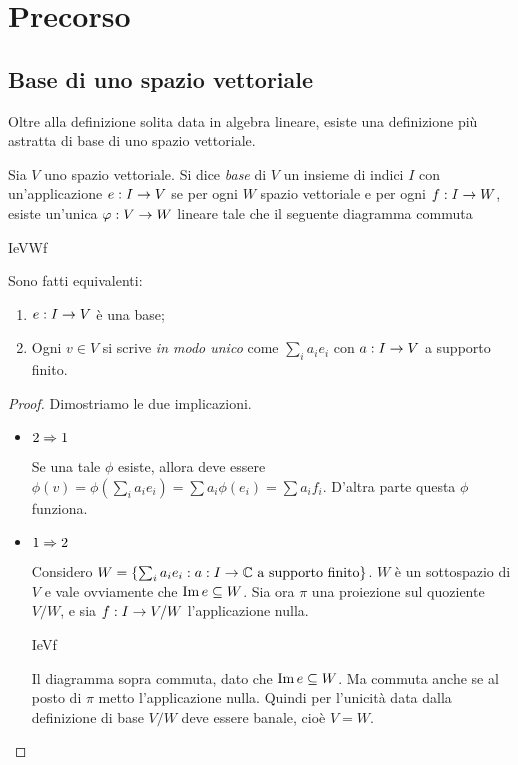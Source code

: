 \section{Precorso}

\subsection{Base di uno spazio vettoriale}
  Oltre alla definizione solita data in algebra lineare, esiste una definizione più astratta di base di uno spazio vettoriale.
  \begin{mydef}
    Sia $V$ uno spazio vettoriale. Si dice \emph{base} di $V$ un insieme di indici $I$ con un'applicazione $e: I \rightarrow V$ se per ogni $W$ spazio vettoriale e per ogni $f: I \rightarrow W$, esiste un'unica $\varphi: V \rightarrow W$ lineare tale che il seguente diagramma commuta

    	\tridiag IeV\phi Wf

  \end{mydef}

  \begin{myprop}
    Sono fatti equivalenti:
    \begin{enumerate}
    \item $e: I \rightarrow V$ è una base;
    \item Ogni $v \in V$ si scrive \emph{in modo unico} come $\sum_i a_ie_i$ con $a: I\rightarrow V$ a supporto finito. 
    \end{enumerate}
  \end{myprop}
  \begin{proof}
    Dimostriamo le due implicazioni.
    \begin{itemize}
      \item $2\Rightarrow 1$
      
      Se una tale $\phi$ esiste, allora deve essere $\phi(v)=\phi(\sum_i a_i e_i) = \sum a_i \phi(e_i) = \sum a_i f_i$. D'altra parte questa $\phi$ funziona.
      
      \item $1 \Rightarrow 2$
      
      Considero $W = \{\sum_i a_ie_i : a:I\rightarrow \mathbb C \mbox{ a supporto finito}\}$. $W$ è un sottospazio di $V$ e vale ovviamente che $\operatorname{Im} e \subseteq W$. Sia ora $\pi$ una proiezione sul quoziente $V/W$, e sia $f: I \rightarrow V/W$ l'applicazione nulla.
	
	\tridiag IeVf
      
      Il diagramma sopra commuta, dato che $\operatorname{Im} e \subseteq W$. Ma commuta anche se al posto di $\pi$ metto l'applicazione nulla. Quindi per l'unicità data dalla definizione di base $V/W$ deve essere banale, cioè $V=W$.
    \end{itemize}
  \end{proof}
  
